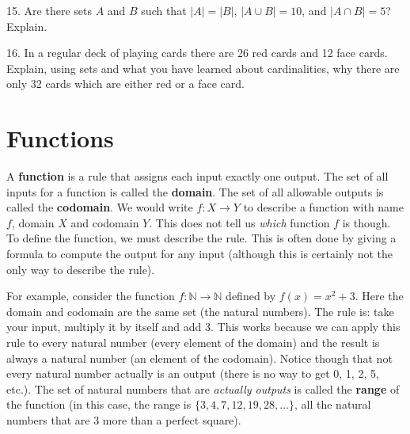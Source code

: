 \documentclass[10pt,]{book}
\newcommand{\terminology}[1]{\textbf{#1}}
\theoremstyle{plain}
\theoremstyle{definition}
\theoremstyle{definition}
\theoremstyle{definition}
\numberwithin{equation}{section}
\def\N{\mathbb N}
\begin{document}
\begin{exerciselist}
\par\smallskip
\item[15.]\hypertarget{exercise-25}{}
          Are there sets \(A\) and \(B\) such that \(|A| = |B|\), \(|A\cup B| = 10\), and \(|A\cap B| = 5\)? Explain.
\par\smallskip
\item[16.]\hypertarget{exercise-26}{}
          In a regular deck of playing cards there are 26 red cards and 12 face cards. Explain, using sets and what you have learned about cardinalities, why there are only 32 cards which are either red or a face card.
\par\smallskip
\end{exerciselist}
\typeout{************************************************}
\typeout{************************************************}
\section[Functions]{Functions}\label{sec_intro-functions}
\typeout{************************************************}
\typeout{************************************************}

      A
      \terminology{function} is a rule that assigns each input exactly one output. The set of all inputs for a function is called the
      \terminology{domain}. The set of all allowable outputs is called the
      \terminology{codomain}. We would write \(f:X \to Y\) to describe a function with name \(f\), domain \(X\) and codomain \(Y\). This does not tell us \emph{which} function \(f\) is though. To define the function, we must describe the rule. This is often done by giving a formula to compute the output for any input (although this is certainly not the only way to describe the rule). %
\par
 For example, consider the function \(f:\N \to \N\) defined by \(f(x) = x^2 + 3\). Here the domain and codomain are the same set (the natural numbers). The rule is: take your input, multiply it by itself and add 3. This works because we can apply this rule to every natural number (every element of the domain) and the result is always a natural number (an element of the codomain). Notice though that not every natural number actually is an output (there is no way to get 0, 1, 2, 5, etc.). The set of natural numbers that are \emph{actually outputs} is called the
      \terminology{range} of the function (in this case, the range is \(\{3, 4, 7, 12, 19, 28, \ldots\}\), all the natural numbers that are 3 more than a perfect square).
\par
\end{document}
